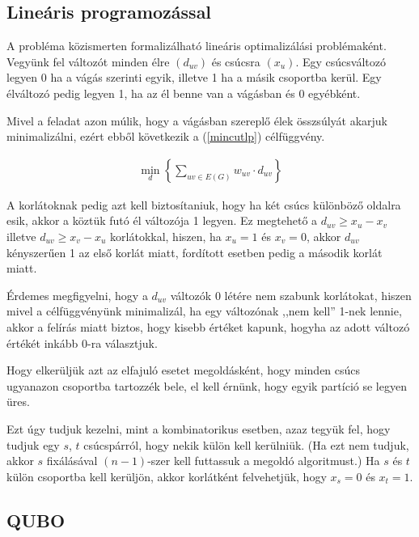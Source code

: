 \subsection{Lineáris programozással}
A probléma közismerten formalizálható lineáris optimalizálási problémaként.
Vegyünk fel változót minden élre $(d_{uv})$ és csúcsra $(x_{u})$. Egy csúcsváltozó legyen 0 ha a vágás szerinti egyik, illetve 1 ha a másik csoportba kerül. Egy élváltozó pedig legyen 1, ha az él benne van a vágásban és 0 egyébként.

Mivel a feladat azon múlik, hogy a vágásban szereplő élek összsúlyát akarjuk minimalizálni, ezért ebből következik a (\ref{mincutlp}) célfüggvény.

\begin{align} 
	\min_{d} \left\{ \sum_ {uv \in E(G)}{w_{uv}\cdot d_{uv}} \right\} \label{mincutlp}
\end{align}

A korlátoknak pedig azt kell biztosítaniuk, hogy ha két csúcs különböző oldalra esik, akkor a köztük futó él változója 1 legyen. Ez megtehető a $d_{uv} \geq x_u - x_v$ illetve $d_{uv} \geq x_v - x_u$ korlátokkal, hiszen, ha $x_u=1$ és $x_v=0$, akkor $d_{uv}$ kényszerűen 1 az első korlát miatt, fordított esetben pedig a második korlát miatt.

Érdemes megfigyelni, hogy a $d_{uv}$ változók 0 létére nem szabunk korlátokat, hiszen mivel a célfüggvényünk minimalizál, ha egy változónak ,,nem kell'' 1-nek lennie, akkor a felírás miatt biztos, hogy kisebb értéket kapunk, hogyha az adott változó értékét inkább 0-ra választjuk.

Hogy elkerüljük azt az elfajuló esetet megoldásként, hogy minden csúcs ugyanazon csoportba tartozzék bele, el kell érnünk, hogy egyik partíció se legyen üres. 

Ezt úgy tudjuk kezelni, mint a kombinatorikus esetben, azaz tegyük fel, hogy tudjuk egy $s$, $t$ csúcspárról, hogy nekik külön kell kerülniük. (Ha ezt nem tudjuk, akkor $s$ fixálásával $(n-1)$-szer kell futtassuk a megoldó algoritmust.)
Ha $s$ és $t$ külön csoportba kell kerüljön, akkor korlátként felvehetjük, hogy $x_s=0$ és $x_t=1$.





\subsection{QUBO}\label{sec:MinCutQUBO}

